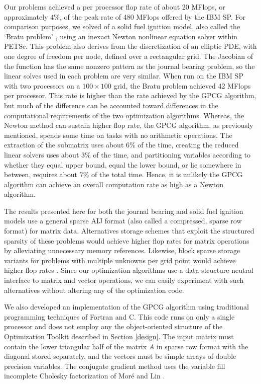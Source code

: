 Our problems achieved a per processor
flop rate of about 20 MFlops, or approximately $4\%$, of the peak rate
of 480 MFlops offered by the IBM SP.  For comparison purposes, we
solved of a solid fuel ignition model, also called
the `Bratu problem' \cite{minpack2},
using an inexact Newton nonlinear equation solver within PETSc.
This problem also derives from the discretization of an elliptic
PDE, with one degree of freedom per node, defined
over a rectangular grid.
The Jacobian of the function has the same nonzero pattern
as the journal bearing problem, so the linear solves used in each
problem are very similar.
When run on the IBM SP with two processors on a $100 \times 100$ grid,
the Bratu problem achieved 42 MFlops per processor.
This rate is higher than the rate achieved by the GPCG algorithm,
but much of the difference can be accounted toward differences in
the computational requirements of the two optimization algorithms.
Whereas, the Newton method can sustain higher flop rate, the
GPCG algorithm, as previously mentioned, spends some time on tasks
with no arithmetic operations.  The extraction of the submatrix
uses about $6\%$ of the time, creating the reduced linear
solvers uses about $3\%$ of the time, and partitioning variables
according to whether they equal upper bound, equal the lower bound,
or lie somewhere in between, requires about $7\%$ of the
total time.  Hence, it is unlikely the GPCG algorithm can
achieve an overall computation rate as high as a Newton algorithm.

The results presented here for both the journal bearing and solid fuel
ignition models use a general sparse AIJ format (also called a
compressed, sparse row format) for matrix data.  Alternatives storage
schemes that exploit the structured sparsity of these problems would
achieve higher flop rates for matrix operations by alleviating
unnecessary memory references.  Likewise, block sparse storage
variants for problems with multiple unknowns per grid point would
achieve higher flop rates \cite{gkmt98}.  Since our optimization
algorithms use a data-structure-neutral interface to matrix and vector
operations, we can easily experiment with such alternatives without
altering any of the optimization code.

We also developed an implementation of the GPCG algorithm
using traditional programming techniques of Fortran and C.
This code runs on only a single processor and does not employ
any the object-oriented structure of the Optimization Toolkit
described in Section \ref{design}.  The input matrix must contain the
lower triangular half of the matrix $A$ in sparse row format
with the diagonal stored separately, and the
vectors must be simple arrays of double precision variables.
The conjugate gradient method uses the variable fill
incomplete Cholesky factorization of Mor\'e and Lin \cite{CJL99a}.

